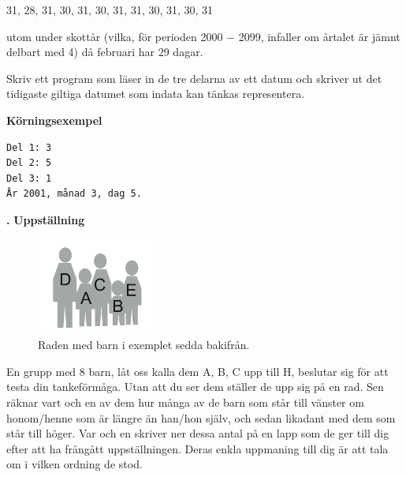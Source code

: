 \documentclass[a4paper,12pt]{article}
\newcounter{iii}\setcounter{iii}{0}
\def\i{\bigskip\noindent\refstepcounter{iii}\textbf{\arabic{iii}.} }
\begin{document}
31, 28, 31, 30, 31, 30, 31, 31, 30, 31, 30, 31

utom under skottår (vilka, för perioden 2000 − 2099, infaller om årtalet är jämnt delbart med 4) då februari har 29 dagar.

Skriv ett program som läser in de tre delarna av ett datum och skriver ut det tidigaste giltiga datumet som indata kan tänkas representera.

\textbf{Körningsexempel}
\begin{lstlisting}
Del 1: 3
Del 2: 5
Del 3: 1
År 2001, månad 3, dag 5.
\end{lstlisting}

\i \textbf{Uppställning}


\begin{figure}[!ht]
\centering
\includegraphics[width=0.35\textwidth]{uppstallning}
\caption{Raden med barn i exemplet sedda bakifrån.}
\label{uppstallning}
\end{figure}

En grupp med 8 barn, låt oss kalla dem A, B, C upp till H, beslutar sig för att testa din tankeförmåga. Utan att du ser dem ställer de upp sig på en rad. Sen räknar vart och en av dem hur många av de barn som står till vänster om honom/henne som är längre än han/hon själv, och sedan likadant med dem som står till höger. Var och en skriver ner dessa antal på en lapp som de ger till dig efter att ha frångått uppställningen. Deras enkla uppmaning till dig är att tala om i vilken ordning de stod.
\end{document}
